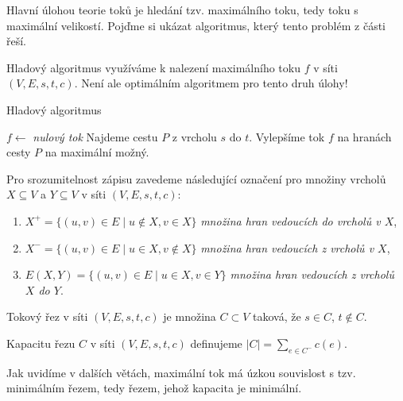 \begin{t_remark}
  Hlavní úlohou teorie toků je hledání tzv. maximálního toku, tedy toku s maximální velikostí. Pojďme si ukázat algoritmus, který tento problém z části řeší.
\end{t_remark}

\begin{t_definition}
  Hladový algoritmus využíváme k nalezení maximálního toku $f$ v síti $(V, E, s, t, c)$. Není ale optimálním algoritmem pro tento druh úlohy!
  
  \begin{algorithm}
    \caption{Hladový algoritmus}
    \begin{algorithmic}[1]
      \State $f\gets$ \textit{nulový tok}
      \Repeat
      \State Najdeme cestu $P$ z vrcholu $s$ do $t$.
      \State Vylepšíme tok $f$ na hranách cesty $P$ na maximální možný.
    \end{algorithmic}
  \end{algorithm}
\end{t_definition}

\begin{t_definition}
  Pro srozumitelnost zápisu zavedeme následující označení pro množiny vrcholů $X\subseteq V$ a $Y\subseteq V$ v síti $(V, E, s, t, c)$:
  \begin{enumerate}
    \item $X^+=\{(u,v)\in E\mid u\notin X, v\in X\}$ \textit{množina hran vedoucích do vrcholů v $X$},
    \item $X^-=\{(u,v)\in E\mid u\in X, v\notin X\}$ \textit{množina hran vedoucích z vrcholů v $X$},
    \item $E(X,Y)=\{(u,v)\in E\mid u\in X, v\in Y\}$ \textit{množina hran vedoucích z vrcholů $X$ do $Y$}.
  \end{enumerate}
\end{t_definition}

\begin{t_definition}
  Tokový řez v síti $(V, E, s, t, c)$ je množina $C\subset V$ taková, že $s\in C$, $t\notin C$.
\end{t_definition}

\begin{t_definition}
  Kapacitu řezu $C$ v síti $(V, E, s, t, c)$ definujeme $|C|=\sum_{e\in C^-} c(e)$.
\end{t_definition}

\begin{t_remark}
  Jak uvidíme v dalších větách, maximální tok má úzkou souvislost s tzv. minimálním řezem, tedy řezem, jehož kapacita je minimální.
\end{t_remark}

